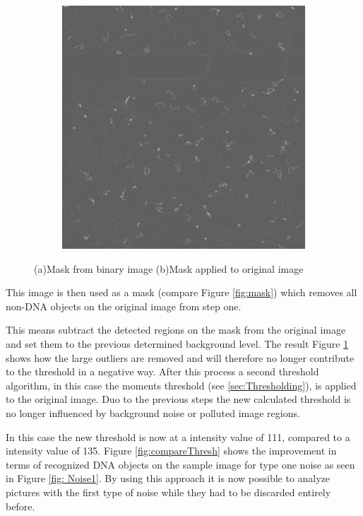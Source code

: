 \documentclass{article}
\begin{document}
\begin{figure}[!htb]
\begin{subfigure}{0.5\textwidth}
		\includegraphics[width=\linewidth]{filtered.png}
		\caption{}
		\label{fig:filtered}
	\end{subfigure}%
	
	\caption{(a)Mask from binary image (b)Mask applied to original image}\label{fig:Process}
\end{figure}
This image is then used as a mask (compare Figure \ref{fig:mask}) which removes all non-DNA objects on the original image from step one.

This means subtract the detected regions on the mask from the original image and set them to the previous determined background level.
The result Figure \ref{fig:filtered} shows how the large outliers are removed and will therefore no longer contribute to the threshold in a negative way.
After this process a second threshold algorithm, in this case the moments threshold (see \ref{sec:Thresholding}), is applied to the original image. 
Duo to the previous steps the new calculated threshold is no longer influenced by background noise or polluted image regions.

In this case the new threshold is now at a intensity value of 111, compared to a intensity value of 135. Figure \ref{fig:compareThresh} shows the improvement in terms of recognized DNA objects on the sample image for type one noise as seen in Figure \ref{fig: Noise1}.
By using this approach it is now possible to analyze pictures with the first type of noise while they had to be discarded entirely before.
\end{document}
